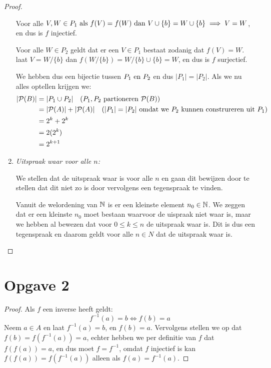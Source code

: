 \documentclass{article}
\begin{document}
\begin{proof}
\begin{enumerate}
			  Voor alle $V, W \in P_1 \text{ als } f(V) = f(W) \text{ dan } V \cup \{b\} = W \cup \{b\} \implies V = W$, en 
			  dus is $f$ injectief. 
			  
			  Voor alle $W \in P_2$ geldt dat er een $V \in P_1$ bestaat zodanig dat $f(V) = W$.
			  laat $V = W \slash \{b\}$ dan $f(W \slash \{b\}) = W\slash\{b\} \cup \{b\} = W$, en dus is
			  $f$ surjectief.

			  We hebben dus een bijectie tussen $P_1 \text{ en } P_2$ en dus $|P_1| = |P_2|$.
		      Als we nu alles optellen krijgen we:
		      \begin{align*}
			      |\mathcal{P}(B)| & = |P_1 \cup P_2|    \quad (P_1, P_2 \text{ partioneren } \mathcal{P}(B))         \\
			                & = |\mathcal{P}(A)| + |\mathcal{P}(A)| \quad (|P_1| = |P_2| \text{ omdat we $P_2$ kunnen construreren uit $P_1$})\\
			                & = 2^k + 2^k             \\
			                & = 2(2^k)                \\
			                & = 2^{k+1}               \\
		      \end{align*}
		\item \emph{Uitspraak waar voor alle $n$:}

		      We stellen dat de uitspraak waar is voor alle
		      $n$ en gaan dit bewijzen door te stellen dat
		      dit niet zo is door vervolgens een tegenspraak
		      te vinden.

		      Vanuit de welordening van $\mathbb{N}$ is er een kleinste
		      element $n_0 \in \mathbb{N}$.
		      We zeggen dat er een kleinste $n_0$ moet bestaan
		      waarvoor de uispraak niet waar is, maar
		      we hebben al bewezen dat voor $0 \leq k \leq n$
		      de uitspraak waar is. Dit is dus een tegenspraak
		      en daarom geldt voor alle $n \in N$ dat de uitspraak waar is.
	\end{enumerate}
\end{proof}
\section*{Opgave 2}
\begin{proof}
Als $f$ een inverse heeft geldt: \[f^{-1}(a) = b \Leftrightarrow f(b) = a\] 
Neem $a \in A$
en laat $f^{-1}(a) = b$, en $f(b) = a$. 
Vervolgens stellen we op dat $f(b) = f(f^{-1}(a)) = a$,
echter hebben we per definitie van $f$ dat $f(f(a)) = a$, en dus moet $f = f^{-1}$, omdat $f$ injectief is
kan $f(f(a)) = f(f^{-1}(a))$ alleen als $f(a) = f^{-1}(a)$.
\end{proof}
\end{document}
